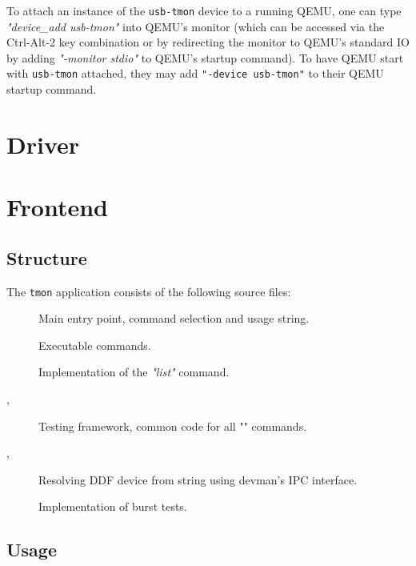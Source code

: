 To attach an instance of the \texttt{usb-tmon} device to a running QEMU, one
can type \textit{"device\_add usb-tmon"} into QEMU's monitor (which can be
accessed via the Ctrl-Alt-2 key combination or by redirecting the
monitor to QEMU's standard IO by adding \textit{"-monitor stdio"} to QEMU's
startup command). To have QEMU start with \texttt{usb-tmon} attached, they may
add \texttt{"-device usb-tmon"} to their QEMU startup command.


\section{Driver}



\section{Frontend}

\subsection{Structure}

The \texttt{tmon} application consists of the following source files:
~
\begin{description}
	\item[]
		Main entry point, command selection and usage string.
	\item[]
		Executable commands.
	\item[]
		Implementation of the \textit{"list"} command.
	\item[, ]
		Testing framework, common code for all "" commands.
	\item[,
		  ]
		Resolving DDF device from string using devman's IPC interface.
	\item[]
		Implementation of burst tests.
\end{description}

\subsection{Usage}

